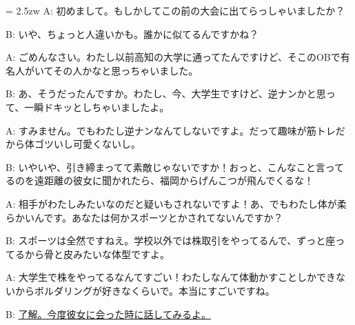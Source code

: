 \documentclass[11pt]{amsart}
\title{}
\author{}
\newenvironment{hangall}[1]{\hangindent = 2.5zw\everypar{\hangindent = 2.5zw}}{}
\begin{document}
\maketitle
\begin{hangall}{}%
A: 初めまして。もしかしてこの前の大会に出てらっしゃいましたか？

B: いや、ちょっと人違いかも。誰かに似てるんですかね？

A: ごめんなさい。わたし以前高知の大学に通ってたんですけど、そこのOBで有名人がいてその人かなと思っちゃいました。

B: あ、そうだったんですか。わたし、今、大学生ですけど、逆ナンかと思って、一瞬ドキッとしちゃいましたよ。

A: すみません。でもわたし逆ナンなんてしないですよ。だって趣味が筋トレだから体ゴツいし可愛くないし。

B: いやいや、引き締まってて素敵じゃないですか！おっと、こんなこと言ってるのを遠距離の彼女に聞かれたら、福岡からげんこつが飛んでくるな！

A: 相手がわたしみたいなのだと疑いもされないですよ！あ、でもわたし体が柔らかいんです。あなたは何かスポーツとかされてないんですか？

B: スポーツは全然ですねえ。学校以外では株取引をやってるんで、ずっと座ってるから骨と皮みたいな体型ですよ。

A: 大学生で株をやってるなんてすごい！わたしなんて体動かすことしかできないからボルダリングが好きなくらいで。本当にすごいですね。

B: \ul{了解。今度彼女に会った時に話してみるよ。}\end{hangall}
\end{document}
